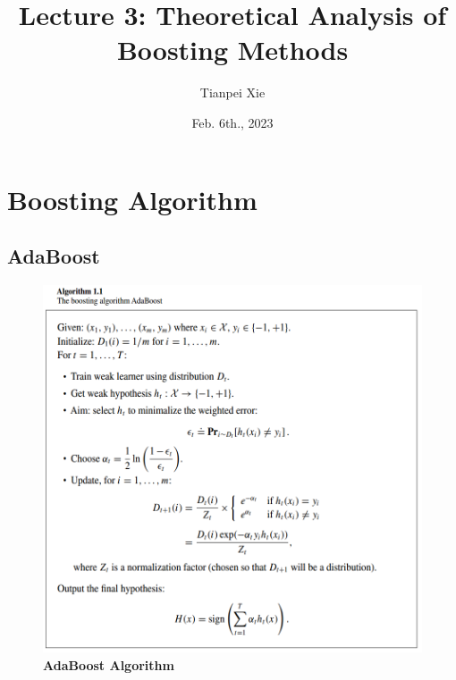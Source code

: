 \documentclass[11pt]{article}
\begin{document}
\title{Lecture 3:  Theoretical Analysis of Boosting Methods}
\author{ Tianpei Xie}
\date{Feb. 6th., 2023}
\maketitle
\tableofcontents
\newpage
\section{Boosting Algorithm}
\subsection{AdaBoost}
\begin{figure}
\begin{minipage}[t]{1\linewidth}
  \centering
  \centerline{\includegraphics[scale = 0.4]{adaboost.png}}
\end{minipage}
\caption{\footnotesize{\textbf{AdaBoost Algorithm \citep{schapire2012boosting}}}}
\label{fig: adaboost}
\end{figure}
\end{document}
